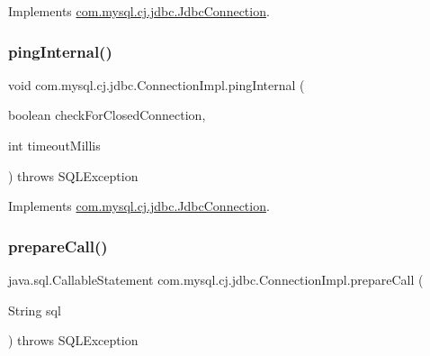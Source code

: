 Implements \mbox{\hyperlink{interfacecom_1_1mysql_1_1cj_1_1jdbc_1_1_jdbc_connection_a6d078258f83ddc438d64bafb0f665004}{com.\+mysql.\+cj.\+jdbc.\+Jdbc\+Connection}}.

\mbox{\label{classcom_1_1mysql_1_1cj_1_1jdbc_1_1_connection_impl_a7da1e11bed26e0346d29c166fc99b133}} 
\subsubsection{\texorpdfstring{ping\+Internal()}{pingInternal()}}
{\footnotesize\ttfamily void com.\+mysql.\+cj.\+jdbc.\+Connection\+Impl.\+ping\+Internal (\begin{DoxyParamCaption}\item[{boolean}]{check\+For\+Closed\+Connection,  }\item[{int}]{timeout\+Millis }\end{DoxyParamCaption}) throws S\+Q\+L\+Exception}



Implements \mbox{\hyperlink{interfacecom_1_1mysql_1_1cj_1_1jdbc_1_1_jdbc_connection_a25615f355be83a136df2efcde168666c}{com.\+mysql.\+cj.\+jdbc.\+Jdbc\+Connection}}.

\mbox{\label{classcom_1_1mysql_1_1cj_1_1jdbc_1_1_connection_impl_aa4436c4ed7f7b2c5ea3f12b62486e844}} 
\subsubsection{\texorpdfstring{prepare\+Call()}{prepareCall()}\hspace{0.1cm}{\footnotesize\ttfamily [1/3]}}
{\footnotesize\ttfamily java.\+sql.\+Callable\+Statement com.\+mysql.\+cj.\+jdbc.\+Connection\+Impl.\+prepare\+Call (\begin{DoxyParamCaption}\item[{String}]{sql }\end{DoxyParamCaption}) throws S\+Q\+L\+Exception}


